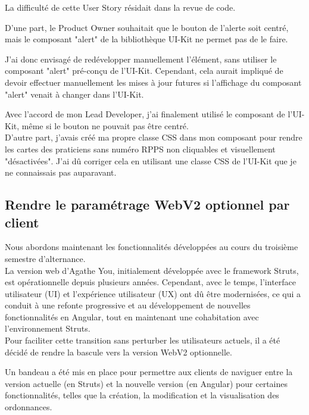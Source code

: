 \documentclass{article}
\begin{document}
La difficulté de cette User Story résidait dans la revue de code.

D'une part, le Product Owner souhaitait que le bouton de l'alerte soit centré, mais le composant "alert" de la bibliothèque UI-Kit ne permet pas de le faire.

J'ai donc envisagé de redévelopper manuellement l'élément, sans utiliser le composant "alert" pré-conçu de l'UI-Kit. Cependant, cela aurait impliqué de devoir effectuer manuellement les mises à jour futures si l'affichage du composant "alert" venait à changer dans l'UI-Kit.

Avec l'accord de mon Lead Developer, j'ai finalement utilisé le composant de l'UI-Kit, même si le bouton ne pouvait pas être centré. \\

D'autre part, j'avais créé ma propre classe CSS dans mon composant pour rendre les cartes des praticiens sans numéro RPPS non cliquables et visuellement "désactivées". J'ai dû corriger cela en utilisant une classe CSS de l'UI-Kit que je ne connaissais pas auparavant.

\subsection{Rendre le paramétrage WebV2 optionnel par client}

Nous abordons maintenant les fonctionnalités développées au cours du troisième semestre d'alternance. \\

La version web d'Agathe You, initialement développée avec le framework Struts, est opérationnelle depuis plusieurs années. Cependant, avec le temps, l'interface utilisateur (UI) et l'expérience utilisateur (UX) ont dû être modernisées, ce qui a conduit à une refonte progressive et au développement de nouvelles fonctionnalités en Angular, tout en maintenant une cohabitation avec l'environnement Struts. \\

Pour faciliter cette transition sans perturber les utilisateurs actuels, il a été décidé de rendre la bascule vers la version WebV2 optionnelle. 

Un bandeau a été mis en place pour permettre aux clients de naviguer entre la version actuelle (en Struts) et la nouvelle version (en Angular) pour certaines fonctionnalités, telles que la création, la modification et la visualisation des ordonnances. \\
\end{document}

